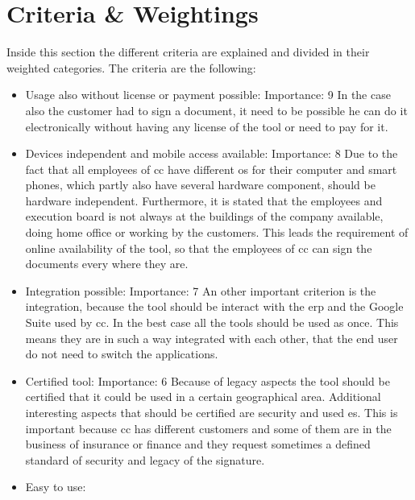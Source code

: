 \section{Criteria \& Weightings} \label{sec:criteria}
Inside this section the different criteria are explained and divided in their
weighted categories. The criteria are the following:
\begin{itemize}
	\item Usage also without license or payment possible: \newline
	Importance: 9 \newline
	In the case also the customer had to sign a document, it need to be possible he can do it electronically without having any license of the tool or need to pay for it.	
	\item Devices independent and mobile access available: \newline
	Importance: 8 \newline
	Due to the fact that all employees of \gls{cc} have different \gls{os} for their computer and smart phones, which partly also have several hardware component, should be hardware independent. Furthermore, it is stated that the employees and execution board is not always at the buildings of the company available, doing home office or working by the customers. This leads the requirement of online availability of the tool, so that the employees of \gls{cc} can sign the documents every where they are.
	\item Integration possible: \newline
	Importance: 7 \newline
	An other important criterion is the integration, because the tool should be interact with the \gls{erp} and the Google Suite used by \gls{cc}. In the best case all the tools should be used as once. This means they are in such a way integrated with each other, that the end user do not need to switch the applications.
	\item Certified tool: \newline
	Importance: 6 \newline
	Because of legacy aspects the tool should be certified that it could be used in a certain geographical area. Additional interesting aspects that should be certified are security and used \gls{es}. This is important because \gls{cc} has different customers and some of them are in the business of insurance or finance and they request sometimes a defined standard of security and legacy of the signature.
	\item Easy to use: \newline

\end{itemize}
